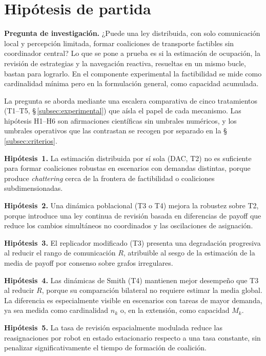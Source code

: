 \section{Hipótesis de partida}
\label{sec:hipotesis}

\textbf{Pregunta de investigación.}
¿Puede una ley distribuida, con solo comunicación local y percepción limitada, formar
coaliciones de transporte factibles sin coordinador central? Lo que se pone a prueba es
si la estimación de ocupación, la revisión de estrategias y la navegación reactiva,
resueltas en un mismo bucle, bastan para lograrlo. En el componente experimental la
factibilidad se mide como cardinalidad mínima pero en la formulación general, como capacidad
acumulada.

La pregunta se aborda mediante una escalera comparativa de cinco tratamientos
(T1--T5, \S\,\ref{subsec:experimental}) que aísla el papel de cada mecanismo. Las
hipótesis H1--H6 son afirmaciones científicas sin umbrales numéricos, y los
umbrales operativos que las contrastan se recogen por separado en la
\S\,\ref{subsec:criterios}.

\textbf{Hipótesis~1.}
La estimación distribuida por sí sola (DAC, T2) no es suficiente
para formar coaliciones robustas en escenarios con demandas distintas, porque produce
\emph{chattering} cerca de la frontera de factibilidad o coaliciones
subdimensionadas.

\textbf{Hipótesis~2.}
Una dinámica poblacional (T3 o T4) mejora la robustez sobre T2, porque introduce
una ley continua de revisión basada en diferencias de payoff que reduce los cambios
simultáneos no coordinados y las oscilaciones de asignación.

\textbf{Hipótesis~3.}
El replicador modificado (T3) presenta una degradación progresiva al reducir el
rango de comunicación $R$, atribuible al sesgo de la estimación de la media de
payoff por consenso sobre grafos irregulares.

\textbf{Hipótesis~4.}
Las dinámicas de Smith (T4) mantienen mejor desempeño que T3 al reducir $R$,
porque su comparación bilateral no requiere estimar la media global. La diferencia
es especialmente visible en escenarios con tareas de mayor demanda, ya sea medida como
cardinalidad $n_k$ o, en la extensión, como capacidad $M_k$.

\textbf{Hipótesis~5.}
La tasa de revisión espacialmente modulada reduce las reasignaciones por robot en
estado estacionario respecto a una tasa constante, sin penalizar significativamente
el tiempo de formación de coalición.

